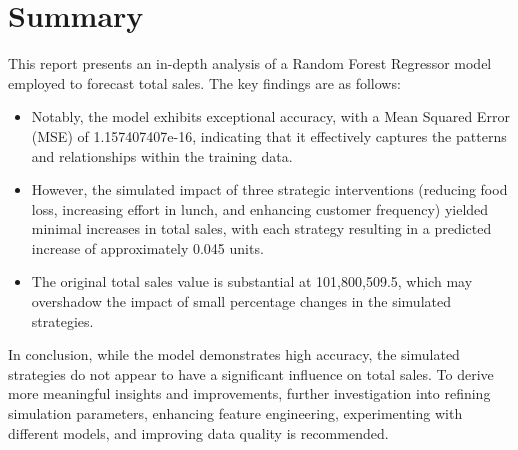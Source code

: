 	\section{Summary}
	
	This report presents an in-depth analysis of a Random Forest Regressor model employed to forecast total sales. The key findings are as follows:
	
	\begin{itemize}
		\item Notably, the model exhibits exceptional accuracy, with a Mean Squared Error (MSE) of 1.157407407e-16, indicating that it effectively captures the patterns and relationships within the training data.
		\item However, the simulated impact of three strategic interventions (reducing food loss, increasing effort in lunch, and enhancing customer frequency) yielded minimal increases in total sales, with each strategy resulting in a predicted increase of approximately 0.045 units.
		\item The original total sales value is substantial at 101,800,509.5, which may overshadow the impact of small percentage changes in the simulated strategies.
	\end{itemize}
	
	In conclusion, while the model demonstrates high accuracy, the simulated strategies do not appear to have a significant influence on total sales. To derive more meaningful insights and improvements, further investigation into refining simulation parameters, enhancing feature engineering, experimenting with different models, and improving data quality is recommended.
